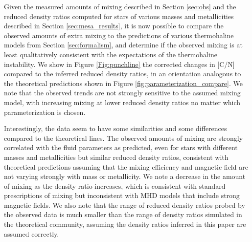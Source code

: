 

Given the measured amounts of mixing described in Section \ref{sec:obs} and the reduced density ratios computed for stars of various masses and metallicities described in Section \ref{sec:mesa_results}, it is now possible to compare the observed amounts of extra mixing to the predictions of various thermohaline models from Section \ref{sec:formalism}, and determine if the observed mixing is at least qualitatively consistent with the expectations of the thermohaline instability. We show in Figure \ref{Fig:punchline} the corrected changes in [C/N] compared to the inferred reduced density ratios, in an orientation analogous to the theoretical predictions shown in Figure \ref{fig:parameterization_compare}. We note that the observed trends are not strongly sensitive to the assumed mixing model, with increasing mixing at lower reduced density ratios no matter which parameterization is chosen. 




Interestingly, the data seem to have some similarities and some differences compared to the theoretical lines. The observed amounts of mixing are strongly correlated with the fluid parameters as predicted, even for stars with different masses and metallicities but similar reduced density ratios, consistent with theoretical predictions assuming that the mixing efficiency and magnetic field are not varying strongly with mass or metallicity. We note a decrease in the amount of mixing as the density ratio increases, which is consistent with standard prescriptions of mixing but inconsistent with MHD models that include strong magnetic fields. We also note that the range of reduced density ratios probed by the observed data is much smaller than the range of density ratios simulated in the theoretical community, assuming the density ratios inferred in this paper are assumed correctly.   


